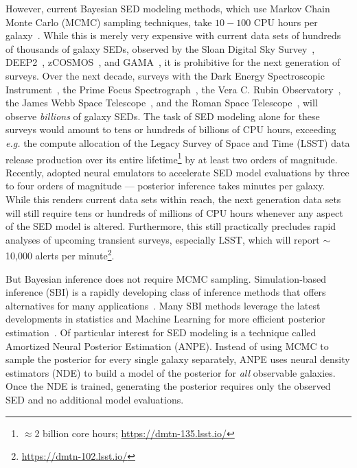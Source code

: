 However, current Bayesian SED modeling methods, which use Markov Chain Monte
Carlo (MCMC) sampling techniques, take $10-100$ CPU hours per
galaxy~\citep[\emph{e.g.}][]{carnall2019a, tacchella2021}. 
While this is merely very expensive with current data sets of hundreds of
thousands of galaxy SEDs, observed by the Sloan Digital Sky
Survey~\citep[SDSS;][]{york2000}, DEEP2~\citep{davis2003},
zCOSMOS~\citep{scoville2007, lilly2007}, and GAMA~\citep{baldry2018}, 
it is prohibitive for the next generation of surveys.
Over the next decade, surveys with the 
Dark Energy Spectroscopic Instrument~\citep[DESI;][]{desicollaboration2016},
the Prime Focus Spectrograph~\citep[PFS;][]{takada2014}, 
the Vera C. Rubin Observatory~\citep{ivezic2019}, 
the James Webb Space Telescope~\citep{gardner2006},
and the Roman Space Telescope~\citep{spergel2015}, will observe \emph{billions}
of galaxy SEDs.
The task of SED modeling alone for these surveys would amount to tens or
hundreds of billions of CPU hours, exceeding \emph{e.g.} the compute allocation
of the Legacy Survey of Space and Time (LSST) data release production  
over its entire lifetime\footnote{$\approx$2 billion core hours;
\url{https://dmtn-135.lsst.io/}} by at least two orders of magnitude.
Recently, \cite{alsing2020} adopted neural emulators to accelerate SED model
evaluations by three to four orders of magnitude --- posterior inference takes
minutes per galaxy.
While this renders current data sets within reach, the next generation data
sets will still require tens or hundreds of millions of CPU hours whenever any
aspect of the SED model is altered.
Furthermore, this still practically precludes rapid analyses of upcoming
transient surveys, especially LSST, which will report $\sim$10,000 alerts per
minute\footnote{\url{https://dmtn-102.lsst.io/}}.

But Bayesian inference does not require MCMC sampling.  
Simulation-based inference (SBI) is a rapidly developing class of inference
methods that offers alternatives for many applications~\citep[see][and
references therein]{cranmer2020}.
Many SBI methods leverage the latest developments in statistics and Machine
Learning for more efficient posterior estimation~\citep{papamakarios2017,
alsing2019a, hahn2019c, dax2021, huppenkothen2021, zhang2021}. 
Of particular interest for SED modeling is a technique called Amortized
Neural Posterior Estimation (ANPE). 
Instead of using MCMC to sample the posterior for every single galaxy
separately, ANPE uses neural density estimators (NDE) to build a model of the
posterior for \emph{all} observable galaxies.
Once the NDE is trained, generating the posterior requires only the observed
SED and no additional model evaluations.

